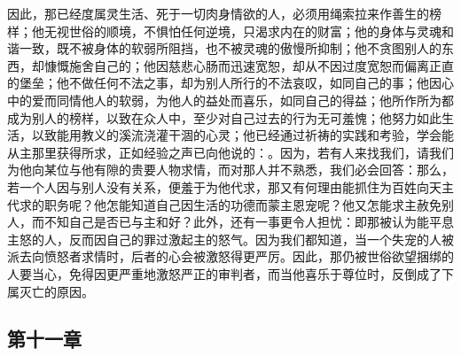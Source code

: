 因此，那已经度属灵生活、死于一切肉身情欲的人，必须用绳索拉来作善生的榜样；他无视世俗的顺境，不惧怕任何逆境，只渴求内在的财富；他的身体与灵魂和谐一致，既不被身体的软弱所阻挡，也不被灵魂的傲慢所抑制；他不贪图别人的东西，却慷慨施舍自己的；他因慈悲心肠而迅速宽恕，却从不因过度宽恕而偏离正直的堡垒；他不做任何不法之事，却为别人所行的不法哀叹，如同自己的事；他因心中的爱而同情他人的软弱，为他人的益处而喜乐，如同自己的得益；他所作所为都成为别人的榜样，以致在众人中，至少对自己过去的行为无可羞愧；他努力如此生活，以致能用教义的溪流浇灌干涸的心灵；他已经通过祈祷的实践和考验，学会能从主那里获得所求，正如经验之声已向他说的：。因为，若有人来找我们，请我们为他向某位与他有隙的贵要人物求情，而对那人并不熟悉，我们必会回答：那么，若一个人因与别人没有关系，便羞于为他代求，那又有何理由能抓住为百姓向天主代求的职务呢？他怎能知道自己因生活的功德而蒙主恩宠呢？他又怎能求主赦免别人，而不知自己是否已与主和好？此外，还有一事更令人担忧：即那被认为能平息主怒的人，反而因自己的罪过激起主的怒气。因为我们都知道，当一个失宠的人被派去向愤怒者求情时，后者的心会被激怒得更严厉。因此，那仍被世俗欲望捆绑的人要当心，免得因更严重地激怒严正的审判者，而当他喜乐于尊位时，反倒成了下属灭亡的原因。\par


\subsection{第十一章}

\par

